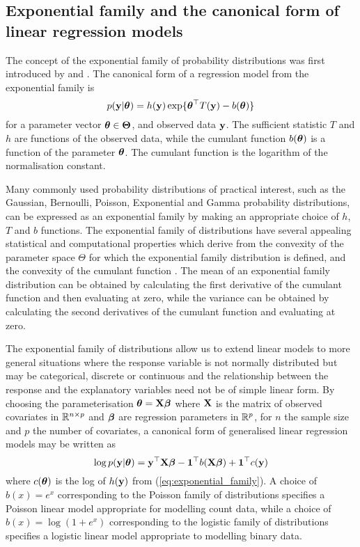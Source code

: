 \subsection{Exponential family and the canonical form of linear regression
models}

The concept of the exponential family of probability distributions was first
introduced by \cite{Koopman1935} and \cite{pitman_1936}. The canonical form of a
regression model from the exponential family is
\begin{equation}\label{eq:exponential_family}
	p({\bf y} | {\boldsymbol \theta}) = h({\bf y}) \exp \{ {\boldsymbol \theta}^\top T({\bf y}) - b({\boldsymbol \theta}) \}
\end{equation}
for a parameter vector ${\boldsymbol \theta} \in \mathbf{\Theta}$, and observed data ${\bf y}$.
The sufficient statistic $T$ and $h$ are functions of the observed data, while
the cumulant function $b({\boldsymbol \theta})$ is a function of the parameter ${\boldsymbol \theta}$. The
cumulant function is the logarithm of the normalisation constant.

Many commonly used probability distributions of practical interest, such as the
Gaussian, Bernoulli, Poisson, Exponential and Gamma probability distributions,
can be expressed as an exponential family by making an appropriate choice of
$h$, $T$ and $b$ functions. The exponential family of distributions have several
appealing statistical and computational properties which derive from the
convexity of the parameter space $\Theta$ for which the exponential family
distribution is defined, and the convexity of the cumulant function
\citep{Jordan2010}. The mean of an exponential family distribution can be
obtained by calculating the first derivative of the cumulant function and then
evaluating at zero, while the variance can be obtained by calculating the second
derivatives of the cumulant function and evaluating at zero.

The exponential family of distributions allow us to extend linear models to more
general situations where the response variable is not normally distributed but
may be categorical, discrete or continuous and the relationship between the
response and the explanatory variables need not be of simple linear form.  By
choosing the parameterisation ${\boldsymbol \theta} = {\bf X} {\boldsymbol \beta}$ where ${\bf X}$ is the matrix
of observed covariates in ${\mathbb{R}}^{n \times p}$ and ${\boldsymbol \beta}$ are regression
parameters in ${\mathbb{R}}^p$, for $n$ the sample size and $p$ the number of covariates,
a canonical form of generalised linear regression models may be written as
\begin{equation}\label{eq:glm}
	\log p({\bf y} | {\boldsymbol \theta}) = {\bf y}^\top {\bf X} {\boldsymbol\beta} - {\bf 1}^\top b({\bf X} {\boldsymbol \beta}) + {\bf 1}^\top c({\bf y})
\end{equation}
where $c({\boldsymbol \theta})$ is the log of $h({\bf y})$ from 
(\ref{eq:exponential_family}). A choice of $b(x) = e^x$ corresponding to the
Poisson family of distributions specifies a Poisson linear model appropriate for
modelling count data, while a choice of $b(x) = \log(1 + e^x)$ corresponding to
the logistic family of distributions specifies a logistic linear model
appropriate to modelling binary data.

